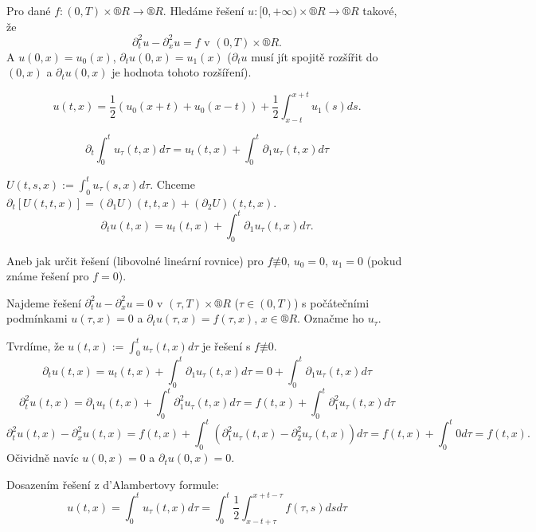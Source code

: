 \documentclass[12pt]{article}					%
\begin{document}
\begin{poznamka}
	Pro dané $f: (0, T) \times ®R \rightarrow ®R$. Hledáme řešení $u: [0, +∞) \times ®R \rightarrow ®R$ takové, že
	$$ \partial_t^2 u - \partial_x^2 u = f \text{ v } (0, T) \times ®R. $$
	A $u(0, x) = u_0(x)$, $\partial_t u(0, x) = u_1(x)$ ($\partial_t u$ musí jít spojitě rozšířit do $(0, x)$ a $\partial_t u(0, x)$ je hodnota tohoto rozšíření).
\end{poznamka}


\begin{definice}
	$$ u(t, x) = \frac{1}{2}(u_0(x + t) + u_0(x - t)) + \frac{1}{2} \int_{x-t}^{x+t} u_1(s) ds. $$
\end{definice}

\begin{lemma}
	$$ \partial_t \int_0^t u_\tau(t, x) d\tau = u_t(t, x) + \int_0^t \partial_1 u_\tau(t, x) d\tau $$

	\begin{dukazin}
		$U(t, s, x) := \int_0^t u_\tau(s, x) d\tau$. Chceme $\partial_t [U(t, t, x)] = (\partial_1 U)(t, t, x) + (\partial_2 U)(t, t, x)$.
		$$ \partial_t u(t, x) = u_t(t, x) + \int_0^t \partial_1 u_\tau(t, x) d\tau. $$
	\end{dukazin}
\end{lemma}

\begin{poznamka}
	Aneb jak určit řešení (libovolné lineární rovnice) pro $f \not≡ 0$, $u_0=0$, $u_1 = 0$ (pokud známe řešení pro $f = 0$).

	Najdeme řešení $\partial_t^2 u - \partial_x^2 u = 0$ v $(\tau, T) \times ®R$ ($\tau \in (0, T)$) s počátečními podmínkami $u(\tau, x) = 0$ a $\partial_t u(\tau, x) = f(\tau, x)$, $x \in ®R$. Označme ho $u_\tau$.

	Tvrdíme, že $u(t, x) := \int_0^t u_\tau(t, x) d\tau$ je řešení s $f \not≡ 0$.
	$$ \partial_t u(t, x) = u_t(t, x) + \int_0^t \partial_1 u_\tau(t, x) d\tau = 0 + \int_0^t \partial_1 u_\tau(t, x) d\tau $$
	$$ \partial_t^2 u(t, x) = \partial_1 u_t(t, x) + \int_0^t \partial_1^2 u_\tau(t, x) d\tau = f(t, x) + \int_0^t \partial_1^2 u_\tau(t, x) d\tau $$
	$$ \partial_t^2 u(t, x) - \partial_x^2 u(t, x) = f(t, x) + \int_0^t (\partial_1^2 u_\tau(t, x) - \partial_2^2 u_\tau(t, x)) d\tau = f(t, x) + \int_0^t 0 d\tau = f(t, x). $$
	Očividně navíc $u(0, x) = 0$ a $\partial_t u(0, x) = 0$.

	Dosazením řešení z d'Alambertovy formule:
	$$ u(t, x) = \int_0^t u_\tau(t, x) d\tau = \int_0^t \frac{1}{2} \int_{x - t + \tau}^{x + t - \tau} f(\tau, s) ds d\tau $$
\end{poznamka}
\end{document}
